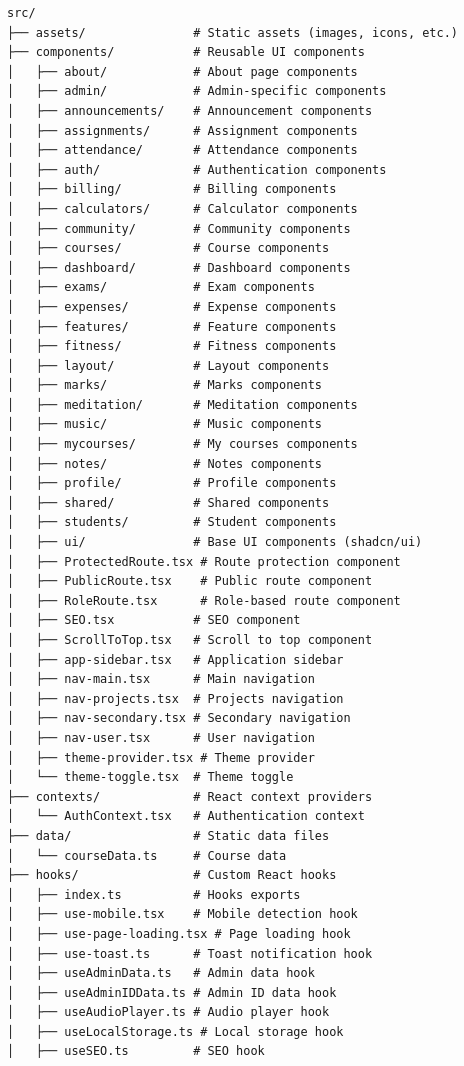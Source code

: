\begin{verbatim}
src/
├── assets/               # Static assets (images, icons, etc.)
├── components/           # Reusable UI components
│   ├── about/            # About page components
│   ├── admin/            # Admin-specific components
│   ├── announcements/    # Announcement components
│   ├── assignments/      # Assignment components
│   ├── attendance/       # Attendance components
│   ├── auth/             # Authentication components
│   ├── billing/          # Billing components
│   ├── calculators/      # Calculator components
│   ├── community/        # Community components
│   ├── courses/          # Course components
│   ├── dashboard/        # Dashboard components
│   ├── exams/            # Exam components
│   ├── expenses/         # Expense components
│   ├── features/         # Feature components
│   ├── fitness/          # Fitness components
│   ├── layout/           # Layout components
│   ├── marks/            # Marks components
│   ├── meditation/       # Meditation components
│   ├── music/            # Music components
│   ├── mycourses/        # My courses components
│   ├── notes/            # Notes components
│   ├── profile/          # Profile components
│   ├── shared/           # Shared components
│   ├── students/         # Student components
│   ├── ui/               # Base UI components (shadcn/ui)
│   ├── ProtectedRoute.tsx # Route protection component
│   ├── PublicRoute.tsx    # Public route component
│   ├── RoleRoute.tsx      # Role-based route component
│   ├── SEO.tsx           # SEO component
│   ├── ScrollToTop.tsx   # Scroll to top component
│   ├── app-sidebar.tsx   # Application sidebar
│   ├── nav-main.tsx      # Main navigation
│   ├── nav-projects.tsx  # Projects navigation
│   ├── nav-secondary.tsx # Secondary navigation
│   ├── nav-user.tsx      # User navigation
│   ├── theme-provider.tsx # Theme provider
│   └── theme-toggle.tsx  # Theme toggle
├── contexts/             # React context providers
│   └── AuthContext.tsx   # Authentication context
├── data/                 # Static data files
│   └── courseData.ts     # Course data
├── hooks/                # Custom React hooks
│   ├── index.ts          # Hooks exports
│   ├── use-mobile.tsx    # Mobile detection hook
│   ├── use-page-loading.tsx # Page loading hook
│   ├── use-toast.ts      # Toast notification hook
│   ├── useAdminData.ts   # Admin data hook
│   ├── useAdminIDData.ts # Admin ID data hook
│   ├── useAudioPlayer.ts # Audio player hook
│   ├── useLocalStorage.ts # Local storage hook
│   ├── useSEO.ts         # SEO hook

\end{verbatim}
